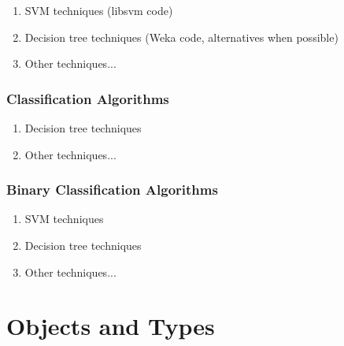 \documentclass{article}
\begin{document}
\begin{multicols}{2}
\begin{enumerate}
\item SVM techniques (libsvm code)
\item Decision tree techniques (Weka code, alternatives when possible)
\item Other techniques...

\end{enumerate}

\subsubsection{Classification Algorithms}

\begin{enumerate}

\item Decision tree techniques
\item Other techniques...

\end{enumerate}

\subsubsection{Binary Classification Algorithms}

\begin{enumerate}

\item SVM techniques
\item Decision tree techniques
\item Other techniques...

\end{enumerate}

\end{multicols}
\pagebreak[2]

\section{Objects and Types}

\label{sec:obj}
\end{document}
